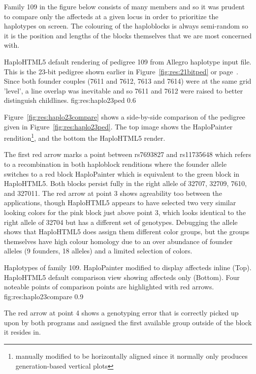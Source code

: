 Family 109 in the figure below consists of many members and so it was prudent to compare only the affecteds at a given locus in order to prioritize the haplotypes on screen. The colouring of the haploblocks is always semi-random so it is the position and lengths of the blocks themselves that we are most concerned with.

	{HaploHTML5 default rendering of pedigree 109 from Allegro haplotype input file. This is the 23-bit pedigree shown earlier in Figure~\ref{fig:res:21bitped} or page~\pageref{fig:res:21bitped}. Since both founder couples (7611 and 7612, 7613 and 7614) were at the same grid 'level', a line overlap was inevitable and so 7611 and 7612 were raised to better distinguish childlines.}
	{fig:res:haplo23ped}
	{0.6}


Figure~\ref{fig:res:haplo23compare} shows a side-by-side comparison of the pedigree given in Figure~\ref{fig:res:haplo23ped}. The top image shows the HaploPainter rendition\footnote{manually modified to be horizontally aligned since it normally only produces generation-based vertical plots}, and the bottom the HaploHTML5 render.

The first red arrow marks a point between rs7693827 and rs11735648  which refers to a recombination in both haploblock renditions where the founder allele switches to a red block HaploPainter which is equivalent to the green block in HaploHTML5. Both blocks persist fully in the right allele of 32707, 32709, 7610, and 327011. The red arrow at point 3 shows agreability too between the applications, though HaploHTML5 appears to have selected two very similar looking colors for the pink block just above point 3, which looks identical to the right allele of 32704 but has a different set of genotypes. Debugging the allele shows that HaploHTML5 does assign them different color groups, but the groups themselves have high colour homology due to an over abundance of founder alleles (9 founders, 18 alleles) and a limited selection of colors. 

\pagebreak
{}
	{Haplotypes of family 109. HaploPainter modified to display affecteds inline (Top). HaploHTML5 default comparison view showing affecteds only (Bottom). Four noteable points of comparison points are highlighted with red arrows.}
	{fig:res:haplo23compare}
	{0.9}

The red arrow at point 4 shows a genotyping error that is correctly picked up upon by both programs and assigned the first available group outside of the block it resides in.

